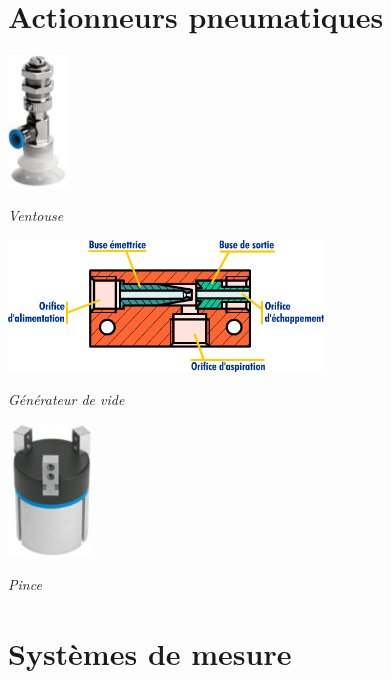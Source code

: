 \documentclass[10pt]{article}
\begin{document}
\section{Actionneurs pneumatiques}

\begin{minipage}[c]{.3\linewidth}
\begin{center}
\includegraphics[height=3.5cm]{images/ventouse_festo}

\textit{Ventouse}
\end{center}
\end{minipage}\hfill
\begin{minipage}[c]{.3\linewidth}
\begin{center}
\includegraphics[height=3.5cm]{images/generateur_vide}

\textit{Générateur de vide}
\end{center}
\end{minipage}\hfill
\begin{minipage}[c]{.3\linewidth}
\begin{center}
\includegraphics[height=3.5cm]{images/pince_festo}

\textit{Pince}
\end{center}
\end{minipage}
\section{Systèmes de mesure}
\end{document}
